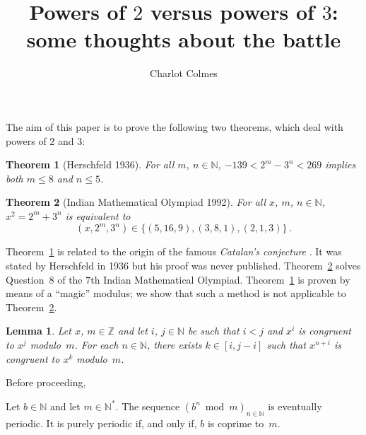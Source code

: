 \documentclass[12pt]{article}
\newcommand{\bZ}{\mathbb{Z}}
\newcommand{\bN}{\mathbb{N}} %
\newcommand{\bNast}{\bN^*}
\newtheorem{theorem}{Theorem}
\newtheorem{lemma}{Lemma}
\theoremstyle{definition}
\begin{document}
 \title{Powers of $2$ versus powers of $3$: some thoughts about the battle}
 \author{Charlot Colmes}
 \maketitle 


 The aim of this paper is to prove the following two theorems, which deal with powers of $2$ and $3$:

   \begin{theorem}[Herschfeld 1936] \label{thm:2m-moins-3n}
     For all $m$, $n \in \bN$,
     $- 139 < 2^m - 3^n  < 269$ implies both $m \le 8$ and $n \le 5$.
   \end{theorem}

   
   \begin{theorem}[Indian Mathematical Olympiad 1992]  \label{thm:IndMO}
     For all $x$, $m$, $n \in \bN$,
     $x^2 = 2^m + 3^n$ is equivalent to
     $$
     (x, 2^m, 3^n) \in \{  (5, 16, 9), (3, 8, 1), (2, 1, 3) \} \, .
     $$
   \end{theorem}

   Theorem~\ref{thm:2m-moins-3n} is related to the origin
   of the famous \emph{Catalan's conjecture} \cite{Ribenboim-Catalan}.
   It was stated by Herschfeld in 1936 \cite{Herschfeld36, Ribenboim-Catalan} but his proof was never published.
   Theorem~\ref{thm:IndMO} solves Question~$8$ of the $7$th Indian Mathematical Olympiad.
   Theorem~\ref{thm:2m-moins-3n} is proven by means of a ``magic'' modulus;
   we show that such a method is not applicable to Theorem~\ref{thm:IndMO}.

   \begin{lemma}
     Let $x$, $m \in \bZ$ and let $i$, $j \in \bN$
     be such that $i < j$ and $x^i$ is congruent to $x^j$ modulo~$m$.
     For each $n \in \bN$,
     there exists $k \in [i, j - i]$ such that $x^{n + i}$ is congruent to $x^k$ modulo~$m$.
   \end{lemma}
   Before proceeding,

   Let $b \in \bN$ and let $m \in \bNast$.
   The sequence $\left( b^n \bmod m \right)_{n \in \bN}$ is eventually periodic.
   It is purely periodic if, and only if, $b$ is coprime to~$m$.
   
\end{document}
